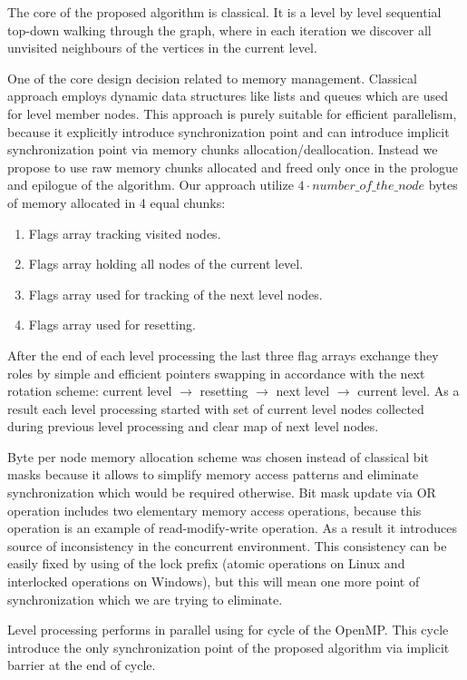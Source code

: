 \documentclass[letterpaper]{article}
\begin{document}
			The core of the proposed algorithm is classical. 
			It is a level by level sequential top-down walking through the graph, where in each iteration we discover all unvisited neighbours of the vertices in the current level.
			
			One of the core design decision related to memory management.
			Classical approach employs dynamic data structures like lists and queues which are used for level member nodes.
			This approach is purely suitable for efficient parallelism, because it explicitly introduce synchronization point and can introduce implicit synchronization point via memory chunks allocation/deallocation. 
			Instead we propose to use raw memory chunks allocated and freed only once in the prologue and epilogue of the algorithm.
			Our approach utilize $4 \cdot number\_of\_the\_node$ bytes of memory allocated in 4 equal chunks:
			\begin{enumerate}
				\item Flags array tracking visited nodes.
				\item Flags array holding all nodes of the current level.
				\item Flags array used for tracking of the next level nodes.
				\item Flags array used for resetting.
			\end{enumerate}
			
			After the end of each level processing the last three flag arrays exchange they roles by simple and efficient pointers swapping in accordance with the next rotation scheme: current level $\to$ resetting $\to$ next level $\to$ current level.
			As a result each level processing started with set of current level nodes collected during previous level processing and clear map of next level nodes. 

			Byte per node memory allocation scheme was chosen instead of classical bit masks because it allows to simplify memory access patterns and eliminate synchronization which would be required otherwise.
			Bit mask update via OR operation includes two elementary memory access operations, because this operation is an example of read-modify-write operation.
			As a result it introduces source of inconsistency in the concurrent environment.
			This consistency can be easily fixed by using of the lock prefix (atomic operations on Linux and interlocked operations on Windows), but this will mean one more point of synchronization which we are trying to eliminate.
			
			Level processing performs in parallel using for cycle of the OpenMP.
			This cycle introduce the only synchronization point of the proposed algorithm via implicit barrier at the end of cycle.
			
\end{document}
